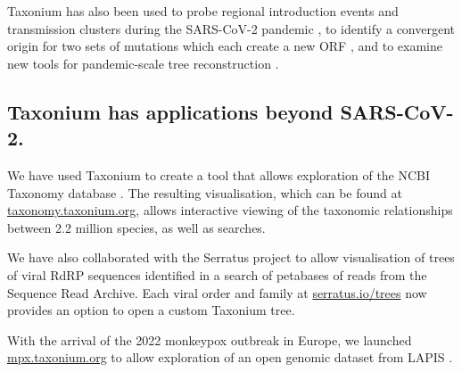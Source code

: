 \documentclass[twocolumn]{bioRxiv}
\begin{document}
Taxonium has also been used  to probe  regional introduction events and transmission clusters during the SARS-CoV-2 pandemic \citep{mcbroome2022identifying}, to identify a convergent origin for two sets of mutations which each create a new ORF \citep{Mears2022}, and to examine new tools for pandemic-scale tree reconstruction \citep{DeMaio2022}.



\subsection*{Taxonium has applications beyond SARS-CoV-2.}

We have used Taxonium to create a tool that allows exploration of the NCBI Taxonomy database \citep{federhen2012ncbi}. The resulting visualisation, which can be found at \href{http://taxonomy.taxonium.org}{taxonomy.taxonium.org}, allows interactive viewing of the taxonomic relationships between 2.2 million species, as well as searches.


We have also collaborated with the Serratus project \citep{edgar2022petabase} to allow visualisation of trees of viral RdRP sequences identified in a search of petabases of reads from the Sequence Read Archive. Each viral order and family at \href{http://serratus.io/trees}{serratus.io/trees} now provides an option to open a custom Taxonium tree.

With the arrival of the 2022 monkeypox outbreak in Europe, we launched \href{http://mpx.taxonium.org}{mpx.taxonium.org} to allow exploration of an open genomic dataset from LAPIS \citep{lapis}.
\end{document}
